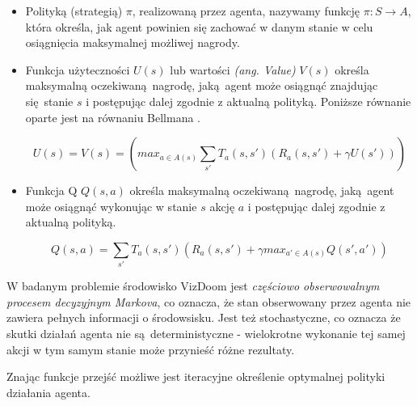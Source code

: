 \begin{itemize}
\item Polityką (strategią) $\pi$, realizowaną przez agenta, nazywamy funkcję $ \pi: S \rightarrow A$, która określa, jak agent powinien się zachować w danym stanie w celu osiągnięcia maksymalnej możliwej nagrody.
\item Funkcja użyteczności $U(s)$ lub wartości \textit{(ang. Value)} $V(s)$ określa maksymalną oczekiwaną nagrodę, jaką agent może osiągnąć znajdując się stanie $s$ i postępując dalej zgodnie z aktualną polityką. Poniższe równanie oparte jest na równaniu Bellmana \cite{bellman1954}.

$$U(s) = V(s) = (max_{a \in A(s)} \sum_{s'} T_a(s,s')(R_a(s,s') + \gamma U(s')))$$
\item Funkcja Q $Q(s,a)$ określa maksymalną oczekiwaną nagrodę, jaką agent może osiągnąć wykonując w stanie $s$ akcję $a$ i postępując dalej zgodnie z aktualną polityką.

$$Q(s,a) = \sum_{s'} T_a(s,s')(R_a(s,s') + \gamma max_{a' \in A(s)}Q(s',a'))$$

\end{itemize}

\vspace{5mm}

W badanym problemie środowisko VizDoom jest \textit{częściowo obserwowalnym procesem decyzyjnym Markova}, co oznacza, że stan obserwowany przez agenta nie zawiera pełnych informacji o środowsisku. Jest też stochastyczne, co oznacza że skutki działań agenta nie są deterministyczne - wielokrotne wykonanie tej samej akcji w tym samym stanie może przynieść różne rezultaty.

Znając funkcje przejść możliwe jest iteracyjne określenie optymalnej polityki działania agenta. 


